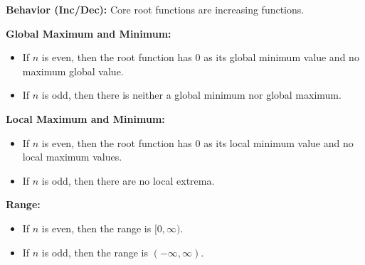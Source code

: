 \documentclass{ximera}
\begin{document}
\begin{explanation}
\textbf{Behavior (Inc/Dec):}  Core root functions are increasing functions.

\textbf{Global Maximum and Minimum:}  

\begin{itemize}
\item If $n$ is even, then the root function has $0$ as its global minimum value and no maximum global value.
\item If $n$ is odd, then there is neither a global minimum nor global maximum.
\end{itemize} 

\textbf{Local Maximum and Minimum:} 


\begin{itemize}
\item If $n$ is even, then the root function has $0$ as its local minimum value and no local maximum values.
\item If $n$ is odd, then there are no local extrema.
\end{itemize} 


\textbf{Range:} 


\begin{itemize}
\item If $n$ is even, then the range is $[0, \infty)$.
\item If $n$ is odd, then the range is $(-\infty, \infty)$.
\end{itemize} 

\end{explanation}
\end{document}
